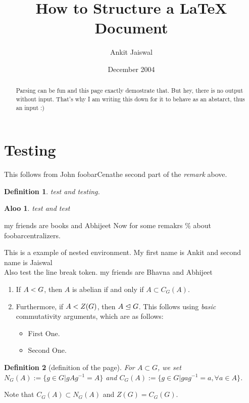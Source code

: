 \documentclass[master.tex]{subfiles}
\author{Ankit Jaiswal}
\newcommand{\foo}{foobar}
\newcommand{\jc}{John \foo Cena}
\newcommand{\name}[2]{My first name is #1 and second name is #2}
\newcommand{\withDefault}[2][books]{my friends are #1 and #2}
\newtheorem{defn*}{Definition}[section]
\newtheorem{aloo}{Aloo}
\begin{document}
  \title{How to Structure a LaTeX Document}
  \date{December 2004}
  \begin{abstract}
  Parsing can be fun and this page exactly demostrate that.
  But hey, there is no output without input. That's why I am writing this
  down for it to behave as an abstarct, thus an input :)
  \end{abstract}

  \maketitle

  \section{Testing}
  This follows from \jc the second part of the \textit{remark} above.
  \begin{defn*}
    test and testing.
  \end{defn*}
  \begin{aloo}
  test and test
  \end{aloo}
  \withDefault{Abhijeet}
  Now for some remakrs \% about \foo centralizers. %
  \vspace{1cm}
  \begin{rmk*}[1.1.3]
    This is a example of nested environment. \name{Ankit}{Jaiswal} \\
    Also test the line break token. \withDefault[Bhavna]{Abhijeet}
    \begin{enumerate}
    \item\label{pehla} If $A \mathrel{<} G$, \medskip then $A$ is abelian if and only if $A \subset
      C_G(A)$.
    \item Furthermore, if $A \mathrel{<} Z(G)$, then $A \mathrel{\unlhd} G$. \newline
      This follows using \emph{basic} commutativity arguments, which are as follows:
      \begin{itemize}
        \item First One.
        \item Second One.
      \end{itemize}
    \end{enumerate}
  \end{rmk*}
  \begin{defn*}[definition of the page]
      For $A \subset G$, we set $N_G(A) := \{g \in G | gAg^{-1} = A\}$ and
      $C_G(A) := \{g \in G | gag^{-1} = a, \forall a \in A\}$.
  \end{defn*}
  Note that $C_G(A) \subset N_G(A)$ and $Z(G) = C_G(G)$.
\end{document}
